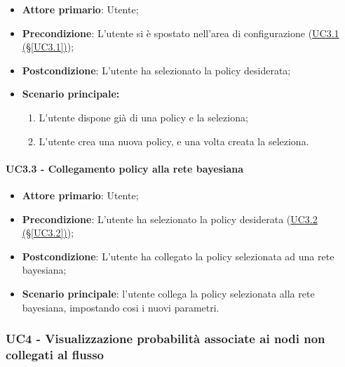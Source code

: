\begin{itemize}
	\item \textbf{Attore primario}: Utente; 
	\item \textbf{Precondizione}: L'utente si è spostato nell'area di configurazione (\hyperref[UC3.1]{UC3.1 (§\ref*{UC3.1})});
	\item \textbf{Postcondizione}: L'utente ha selezionato la policy desiderata;
	\item \textbf{Scenario principale:}
	\begin{enumerate}
		\item L'utente dispone già di una policy e la seleziona; 
		\item L'utente crea una nuova policy, e una volta creata la seleziona. 
	\end{enumerate}
	
\end{itemize}

\paragraph{UC3.3 - Collegamento policy alla rete bayesiana}\label{UC3.3}
\begin{itemize}
	\item \textbf{Attore primario}: Utente; 
	\item \textbf{Precondizione}: L'utente ha selezionato la policy desiderata (\hyperref[UC3.2]{UC3.2 (§\ref*{UC3.2})});
	\item \textbf{Postcondizione}: L'utente ha collegato la policy selezionata ad una rete bayesiana; 
	\item \textbf{Scenario principale}: l'utente collega la policy selezionata alla rete bayesiana, impostando cosi i nuovi parametri. 
\end{itemize}

\newpage


\subsubsection{UC4 - Visualizzazione probabilità associate ai nodi non collegati al flusso}\label{UC4}

